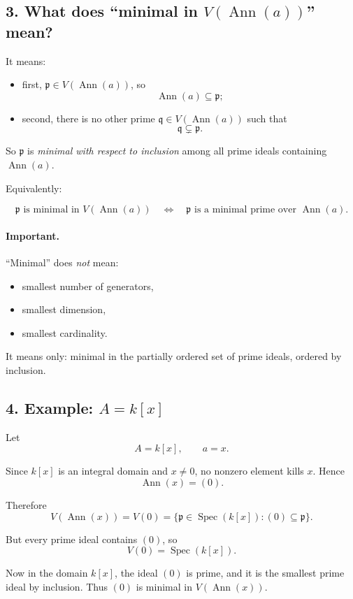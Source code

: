\documentclass[12pt,a4paper]{article}
\theoremstyle{notespace}
\DeclareMathOperator{\Spec}{Spec}
\DeclareMathOperator{\Ann}{Ann}
\begin{document}
\subsection*{3. What does ``minimal in \(V(\Ann(a))\)'' mean?}

It means:

\begin{itemize}
	\item first, \(\mathfrak p\in V(\Ann(a))\), so
	\[
	\Ann(a)\subseteq \mathfrak p;
	\]
	\item second, there is no other prime \(\mathfrak q\in V(\Ann(a))\) such that
	\[
	\mathfrak q\subsetneq \mathfrak p.
	\]
\end{itemize}

So \(\mathfrak p\) is \emph{minimal with respect to inclusion} among all prime ideals containing \(\Ann(a)\).

Equivalently:

\[
\mathfrak p \text{ is minimal in } V(\Ann(a))
\quad\Longleftrightarrow\quad
\mathfrak p \text{ is a minimal prime over } \Ann(a).
\]

\paragraph{Important.}
``Minimal'' does \emph{not} mean:
\begin{itemize}
	\item smallest number of generators,
	\item smallest dimension,
	\item smallest cardinality.
\end{itemize}

It means only: minimal in the partially ordered set of prime ideals, ordered by inclusion.

\subsection*{4. Example: \(A=k[x]\)}

Let
\[
A=k[x],
\qquad
a=x.
\]

Since \(k[x]\) is an integral domain and \(x\neq 0\), no nonzero element kills \(x\). Hence
\[
\Ann(x)=(0).
\]

Therefore
\[
V(\Ann(x))=V(0)=\{\mathfrak p\in \Spec(k[x]): (0)\subseteq \mathfrak p\}.
\]

But every prime ideal contains \((0)\), so
\[
V(0)=\Spec(k[x]).
\]

Now in the domain \(k[x]\), the ideal \((0)\) is prime, and it is the smallest prime ideal by inclusion. Thus \((0)\) is minimal in \(V(\Ann(x))\).
\end{document}
